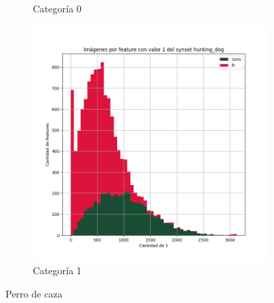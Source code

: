 \documentclass[12,twoside]{TFG-GM}
\theoremstyle{definition}
\theoremstyle{remark}
\begin{document}
\begin{figure}[ht]
\begin{subfigure}[b]{0.3\textwidth}
		\caption{Categoría 0}
	\end{subfigure}
	\begin{subfigure}[b]{0.3\textwidth}
		\includegraphics[width=\textwidth]  {Images/plots/25/synsets/Images_per_feature_of_1_category_hunting_dogall_layers.png}
		\caption{Categoría 1}
	\end{subfigure}       
	\caption{Perro de caza}
\end{figure}
\end{document}
